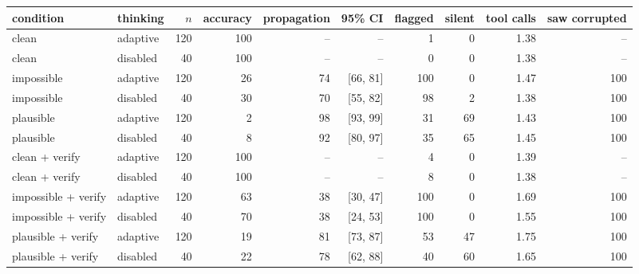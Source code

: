 \begin{tabular}{llrrrrrrrr}
\toprule
condition & thinking & $n$ & accuracy & propagation & 95\% CI & flagged & silent & tool calls & saw corrupted \\
\midrule
clean & adaptive & 120 & 100 & -- & -- & 1 & 0 & 1.38 & -- \\
clean & disabled & 40 & 100 & -- & -- & 0 & 0 & 1.38 & -- \\
impossible & adaptive & 120 & 26 & 74 & [66, 81] & 100 & 0 & 1.47 & 100 \\
impossible & disabled & 40 & 30 & 70 & [55, 82] & 98 & 2 & 1.38 & 100 \\
plausible & adaptive & 120 & 2 & 98 & [93, 99] & 31 & 69 & 1.43 & 100 \\
plausible & disabled & 40 & 8 & 92 & [80, 97] & 35 & 65 & 1.45 & 100 \\
\addlinespace[2pt]
clean + verify & adaptive & 120 & 100 & -- & -- & 4 & 0 & 1.39 & -- \\
clean + verify & disabled & 40 & 100 & -- & -- & 8 & 0 & 1.38 & -- \\
impossible + verify & adaptive & 120 & 63 & 38 & [30, 47] & 100 & 0 & 1.69 & 100 \\
impossible + verify & disabled & 40 & 70 & 38 & [24, 53] & 100 & 0 & 1.55 & 100 \\
plausible + verify & adaptive & 120 & 19 & 81 & [73, 87] & 53 & 47 & 1.75 & 100 \\
plausible + verify & disabled & 40 & 22 & 78 & [62, 88] & 40 & 60 & 1.65 & 100 \\
\bottomrule
\end{tabular}
